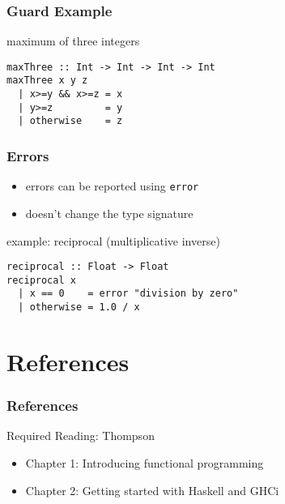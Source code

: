 \documentclass[dvipsnames]{beamer}
\theoremstyle{plain}
\begin{document}
\begin{frame}[fragile]
  \frametitle{Guard Example}

  \begin{exampleblock}{maximum of three integers}
    \begin{lstlisting}
maxThree :: Int -> Int -> Int -> Int
maxThree x y z
  | x>=y && x>=z = x
  | y>=z         = y
  | otherwise    = z
    \end{lstlisting}
  \end{exampleblock}
\end{frame}

\begin{frame}[fragile]
  \frametitle{Errors}

  \begin{itemize}
    \item errors can be reported using \lstinline|error|
    \item doesn't change the type signature
  \end{itemize}

  \begin{exampleblock}{example: reciprocal (multiplicative inverse)}
    \begin{lstlisting}
reciprocal :: Float -> Float
reciprocal x
  | x == 0    = error "division by zero"
  | otherwise = 1.0 / x
    \end{lstlisting}
  \end{exampleblock}
\end{frame}

\section*{References}

\begin{frame}
  \frametitle{References}

  \begin{block}{Required Reading: Thompson}
    \begin{itemize}
      \item Chapter 1: \alert{Introducing functional programming}
      \item Chapter 2: \alert{Getting started with Haskell and GHCi}
    \end{itemize}
  \end{block}
\end{frame}
\end{document}
